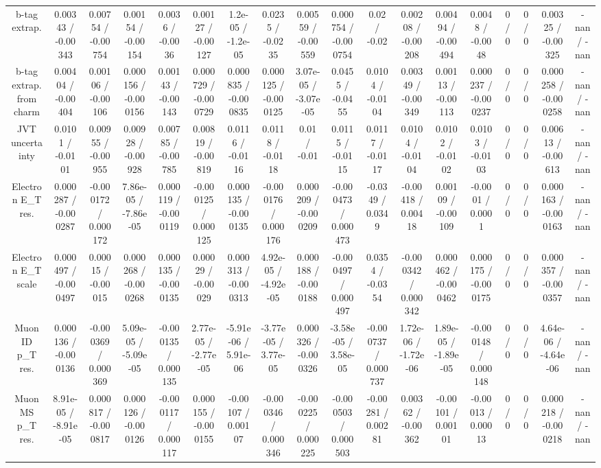 \documentclass[10pt]{article}
\begin{document}
\begin{table}[htbp]
\begin{center}
\begin{tabular}{|c|c|c|c|c|c|c|c|c|c|c|c|c|c|c|c|c|c|}
  b-tag extrap. & 0.00343 / -0.00343 & 0.00754 / -0.00754 & 0.00154 / -0.00154 & 0.0036 / -0.0036 & 0.00127 / -0.00127 & 1.2e-05 / -1.2e-05 & 0.0235 / -0.0235 & 0.00559 / -0.00559 & 0.000754 / -0.000754 & 0.02 / -0.02 & 0.00208 / -0.00208 & 0.00494 / -0.00494 & 0.0048 / -0.0048 & 0 / 0 & 0 / 0 & 0.00325 / -0.00325 & -nan / -nan \\ 
  b-tag extrap. from charm & 0.00404 / -0.00404 & 0.00106 / -0.00106 & 0.000156 / -0.000156 & 0.00143 / -0.00143 & 0.000729 / -0.000729 & 0.000835 / -0.000835 & 0.000125 / -0.000125 & 3.07e-05 / -3.07e-05 & 0.0455 / -0.0455 & 0.0104 / -0.0104 & 0.00349 / -0.00349 & 0.00113 / -0.00113 & 0.000237 / -0.000237 & 0 / 0 & 0 / 0 & 0.000258 / -0.000258 & -nan / -nan \\ 
  JVT uncertainty & 0.0101 / -0.0101 & 0.00955 / -0.00955 & 0.00928 / -0.00928 & 0.00785 / -0.00785 & 0.00819 / -0.00819 & 0.0116 / -0.0116 & 0.0118 / -0.0118 & 0.01 / -0.01 & 0.0115 / -0.0115 & 0.0117 / -0.0117 & 0.0104 / -0.0104 & 0.0102 / -0.0102 & 0.0103 / -0.0103 & 0 / 0 & 0 / 0 & 0.00613 / -0.00613 & -nan / -nan \\ 
  Electron E_{T} res. & 0.000287 / -0.000287 & -0.000172 / 0.000172 & 7.86e-05 / -7.86e-05 & 0.000119 / -0.000119 & -0.000125 / 0.000125 & 0.000135 / -0.000135 & -0.000176 / 0.000176 & 0.000209 / -0.000209 & -0.000473 / 0.000473 & -0.0349 / 0.0349 & -0.00418 / 0.00418 & 0.00109 / -0.00109 & -0.0001 / 0.0001 & 0 / 0 & 0 / 0 & 0.000163 / -0.000163 & -nan / -nan \\ 
  Electron E_{T} scale & 0.000497 / -0.000497 & 0.00015 / -0.00015 & 0.000268 / -0.000268 & 0.000135 / -0.000135 & 0.00029 / -0.00029 & 0.000313 / -0.000313 & 4.92e-05 / -4.92e-05 & 0.000188 / -0.000188 & -0.000497 / 0.000497 & 0.0354 / -0.0354 & -0.000342 / 0.000342 & 0.000462 / -0.000462 & 0.000175 / -0.000175 & 0 / 0 & 0 / 0 & 0.000357 / -0.000357 & -nan / -nan \\ 
  Muon ID p_{T} res. & 0.000136 / -0.000136 & -0.000369 / 0.000369 & 5.09e-05 / -5.09e-05 & -0.000135 / 0.000135 & 2.77e-05 / -2.77e-05 & -5.91e-06 / 5.91e-06 & -3.77e-05 / 3.77e-05 & 0.000326 / -0.000326 & -3.58e-05 / 3.58e-05 & -0.000737 / 0.000737 & 1.72e-06 / -1.72e-06 & 1.89e-05 / -1.89e-05 & -0.000148 / 0.000148 & 0 / 0 & 0 / 0 & 4.64e-06 / -4.64e-06 & -nan / -nan \\ 
  Muon MS p_{T} res. & 8.91e-05 / -8.91e-05 & 0.000817 / -0.000817 & 0.000126 / -0.000126 & -0.000117 / 0.000117 & 0.000155 / -0.000155 & -0.00107 / 0.00107 & -0.000346 / 0.000346 & -0.000225 / 0.000225 & -0.000503 / 0.000503 & -0.00281 / 0.00281 & 0.00362 / -0.00362 & -0.00101 / 0.00101 & -0.00013 / 0.00013 & 0 / 0 & 0 / 0 & 0.000218 / -0.000218 & -nan / -nan \\ 

\end{tabular}
\end{center}
\end{table}
\end{document}

